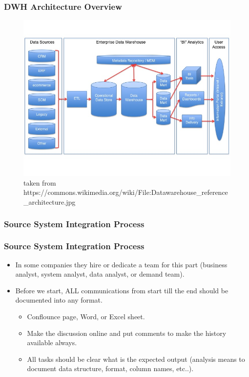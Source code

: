 \begin{frame}
    \frametitle{DWH Architecture Overview}
    \begin{figure}[ht]
        \centering
        \includegraphics[width=.9\linewidth,height=.8\textheight]{./Figures/chapter-01/Datawarehouse_reference_architecture.jpg}
        \caption{taken from https://commons.wikimedia.org/wiki/File:Datawarehouse\_reference\_architecture.jpg}
    \end{figure}
\end{frame}

\subsubsection{Source System Integration Process}
\begin{frame}
    \frametitle{Source System Integration Process}
    \begin{itemize}[<+->]
        \item In some companies they hire or dedicate a team for this part (business analyst, system analyst, data analyst, or demand team).
        \item Before we start, ALL communications from start till the end should be documented into any format.
        \begin{itemize}
            \item  Conflounce page, Word, or Excel sheet.
            \item  Make the discussion online and put comments to make the history available always.
            \item  All tasks should be clear what is the expected output \faEdit \space \faArrowCircleORight \space (analysis means to document data structure, format, column names, etc..).
        \end{itemize}
    \end{itemize}

\end{frame}

